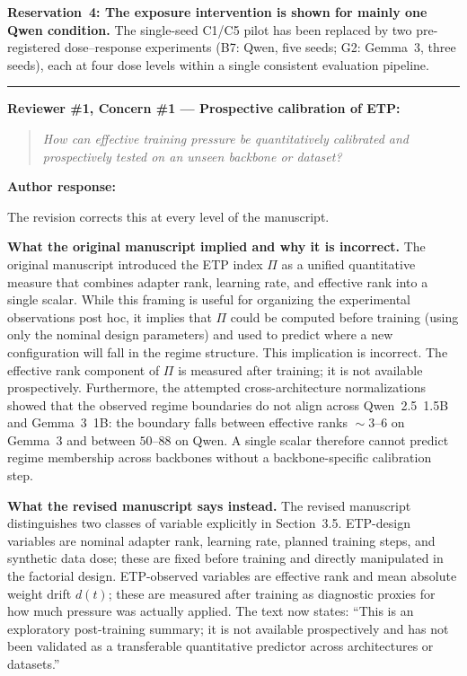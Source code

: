 \documentclass[11pt,a4paper]{article}
\newcommand{\rconcern}[3]{%
  \bigskip\noindent\rule{\linewidth}{0.4pt}\par\medskip
  \noindent\textbf{\textcolor{rccolor}{#1 --- #2:}}\par
  \smallskip
  \begin{quote}\itshape\textcolor{rccolor}{#3}\end{quote}%
}
\newcommand{\arhead}[1]{\medskip\noindent\textbf{#1}\par\smallskip}
\newcommand{\newtext}[1]{\textcolor{chgcolor}{``#1''}}
\begin{document}
\textbf{Reservation~4: The exposure intervention is shown for mainly one Qwen condition.}
The single-seed C1/C5 pilot has been replaced by two pre-registered
dose--response experiments (B7: Qwen, five seeds; G2: Gemma~3, three seeds),
each at four dose levels within a single consistent evaluation pipeline.

\rconcern{Reviewer \#1, Concern \#1}{Prospective calibration of ETP}{How can effective training pressure be quantitatively calibrated and prospectively tested on an unseen backbone or dataset?}

\arhead{Author response:}
The revision corrects this at every level of the manuscript.

\textbf{What the original manuscript implied and why it is incorrect.}
The original manuscript introduced the ETP index $\Pi$ as a unified
quantitative measure that combines adapter rank, learning rate, and
effective rank into a single scalar. While this framing is useful for
organizing the experimental observations post hoc, it implies that $\Pi$
could be computed before training (using only the nominal design parameters)
and used to predict where a new configuration will fall in the regime
structure. This implication is incorrect. The effective rank component of
$\Pi$ is measured after training; it is not available prospectively.
Furthermore, the attempted cross-architecture normalizations showed that
the observed regime boundaries do not align across Qwen~2.5~1.5B and
Gemma~3~1B: the boundary falls between effective ranks ${}\sim3$--$6$
on Gemma~3 and between $50$--$88$ on Qwen. A single scalar therefore
cannot predict regime membership across backbones without a backbone-specific
calibration step.

\textbf{What the revised manuscript says instead.}
The revised manuscript distinguishes two classes of variable explicitly in
Section~3.5. ETP-design variables are nominal adapter rank, learning rate,
planned training steps, and synthetic data dose; these are fixed before
training and directly manipulated in the factorial design.
ETP-observed variables are effective rank and mean absolute weight drift
$d(t)$; these are measured after training as diagnostic proxies for how
much pressure was actually applied. The text now states:
\newtext{This is an exploratory post-training summary; it is not available
prospectively and has not been validated as a transferable quantitative
predictor across architectures or datasets.}
\end{document}
